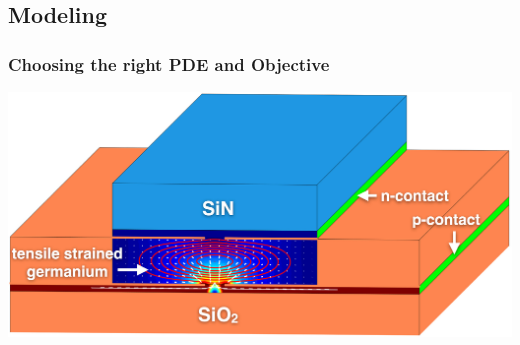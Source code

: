 \documentclass[aspectratio=169,xcolor=dvipsnames,10pt]{beamer}
\begin{document}
\subsection{Modeling}
\begin{frame}\frametitle{Choosing the right PDE and Objective}

\begin{example}
\centering
      \includegraphics[width=0.6\linewidth]{Part I/figures/graphical_abstract_ieee.jpeg}
\end{example}
\end{frame}

      
\end{document}
